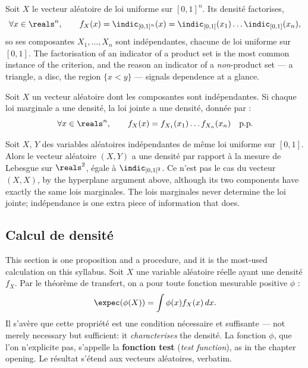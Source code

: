 \begin{example}
  Soit $X$ le vecteur aléatoire de loi uniforme sur $[0,1]^{n}$. Its densité
  factorises,
  \[
    \forall x \in \reals^{n}, \qquad
    f_{X}(x) = \indic_{[0,1]^{n}}(x) = \indic_{[0,1]}(x_{1}) \dots \indic_{[0,1]}(x_{n}),
  \]
  so ses composantes $X_{1},\dots,X_{n}$ sont indépendantes, chacune de loi
  uniforme sur $[0,1]$. The factorisation of an indicator of a product set is the
  most common instance of the criterion, and the reason an indicator of a
  \emph{non}-product set --- a triangle, a disc, the region $\{x < y\}$ ---
  signals dependence at a glance.
\end{example}

\begin{prop}
  Soit $X$ un vecteur aléatoire dont les composantes sont indépendantes. Si chaque
  loi marginale a une densité, la loi jointe a une densité, donnée par :
  \[
    \forall x \in \reals^{n}, \qquad
    f_{X}(x) = f_{X_{1}}(x_{1}) \dots f_{X_{n}}(x_{n}) \quad \text{p.p.}
  \]
\end{prop}

\begin{example}
  Soit $X$, $Y$ des variables aléatoires indépendantes de même loi uniforme sur
  $[0,1]$. Alors le vecteur aléatoire $(X,Y)$ a une densité par rapport à la
  mesure de Lebesgue sur $\reals^{2}$, égale à $\indic_{[0,1]^{2}}$. Ce n'est pas
  le cas du vecteur $(X,X)$, by the hyperplane argument above, although its two
  components have exactly the same lois marginales. The lois marginales never
  determine the loi jointe; indépendance is one extra piece of information that
  does.
\end{example}

\subsection{Calcul de densité}

This section is one proposition and a procedure, and it is the most-used
calculation on this syllabus. Soit $X$ une variable aléatoire réelle ayant une
densité $f_{X}$. Par le théorème de transfert, on a pour toute fonction mesurable
positive $\phi$ :
\[
  \expec(\phi(X)) = \int \phi(x) f_{X}(x)\,dx .
\]
Il s'avère que cette propriété est une condition nécessaire et suffisante --- not
merely necessary but sufficient: it \emph{characterises} the densité. La fonction
$\phi$, que l'on n'explicite pas, s'appelle la \textbf{fonction test} (\textit{test function}), as in the chapter
opening. Le résultat s'étend aux vecteurs aléatoires, verbatim.


